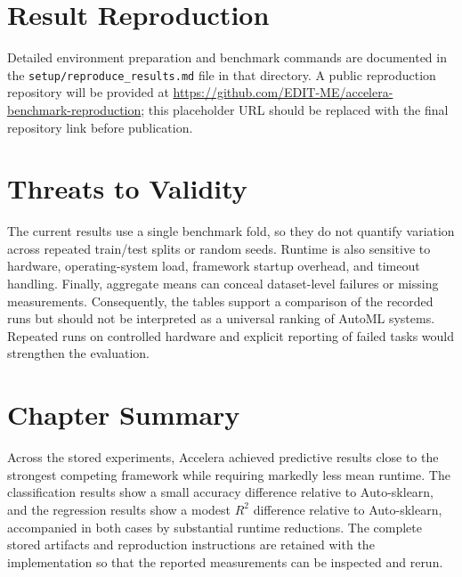 \documentclass[12pt,a4paper,oneside]{report}
\newcommand{\modulepath}[1]{\texttt{\footnotesize #1}}
\begin{document}
\section{Result Reproduction}

Detailed
environment preparation and benchmark commands are documented in the
\modulepath{setup/reproduce\_results.md} file in that directory. A public
reproduction repository will be provided at
\url{https://github.com/EDIT-ME/accelera-benchmark-reproduction}; this
placeholder URL should be replaced with the final repository link before
publication.

\section{Threats to Validity}

The current results use a single benchmark fold, so they do not quantify
variation across repeated train/test splits or random seeds. Runtime is also
sensitive to hardware, operating-system load, framework startup overhead, and
timeout handling. Finally, aggregate means can conceal dataset-level failures
or missing measurements. Consequently, the tables support a comparison of the
recorded runs but should not be interpreted as a universal ranking of AutoML
systems. Repeated runs on controlled hardware and explicit reporting of failed
tasks would strengthen the evaluation.

\section{Chapter Summary}

Across the stored experiments, Accelera achieved predictive results close to
the strongest competing framework while requiring markedly less mean runtime.
The classification results show a small accuracy difference relative to
Auto-sklearn, and the regression results show a modest $R^2$ difference
relative to Auto-sklearn, accompanied in both cases by substantial runtime
reductions.
The complete stored artifacts and reproduction instructions are retained with
the implementation so that the reported measurements can be inspected and
rerun.

\end{document}
